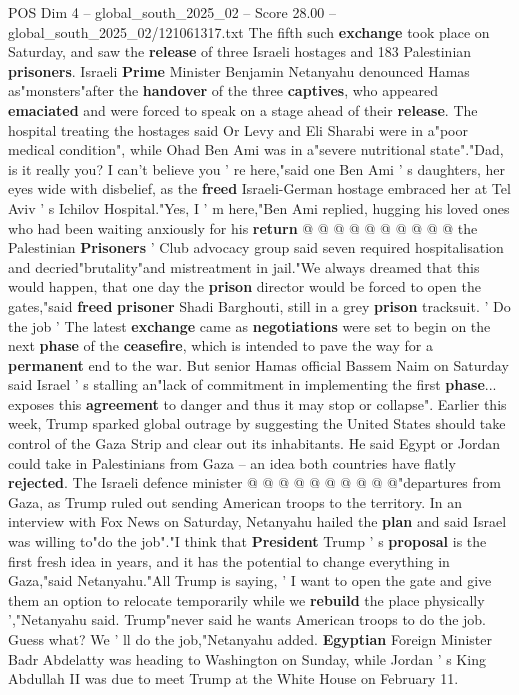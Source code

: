 \begin{textsample}{POS Dim 4 – global\_south\_2025\_02 – Score 28.00 – global\_south\_2025\_02/121061317.txt}
The fifth such \textbf{exchange} took place on Saturday, and saw the \textbf{release} of three Israeli hostages and 183 Palestinian \textbf{prisoners}.
Israeli \textbf{Prime} Minister Benjamin Netanyahu denounced Hamas as"monsters"after the \textbf{handover} of the three \textbf{captives}, who appeared \textbf{emaciated} and were forced to speak on a stage ahead of their \textbf{release}.
The hospital treating the hostages said Or Levy and Eli Sharabi were in a"poor medical condition", while Ohad Ben Ami was in a"severe nutritional state"."Dad, is it really you?
I can't believe you ' re here,"said one Ben Ami ' s daughters, her eyes wide with disbelief, as the \textbf{freed} Israeli-German hostage embraced her at Tel Aviv ' s Ichilov Hospital."Yes, I ' m here,"Ben Ami replied, hugging his loved ones who had been waiting anxiously for his \textbf{return} @ @ @ @ @ @ @ @ @ @ the Palestinian \textbf{Prisoners} ' Club advocacy group said seven required hospitalisation and decried"brutality"and mistreatment in jail."We always dreamed that this would happen, that one day the \textbf{prison} director would be forced to open the gates,"said \textbf{freed} \textbf{prisoner} Shadi Barghouti, still in a grey \textbf{prison} tracksuit. ' Do the job ' The latest \textbf{exchange} came as \textbf{negotiations} were set to begin on the next \textbf{phase} of the \textbf{ceasefire}, which is intended to pave the way for a \textbf{permanent} end to the war.
But senior Hamas official Bassem Naim on Saturday said Israel ' s stalling an"lack of commitment in implementing the first \textbf{phase}... exposes this \textbf{agreement} to danger and thus it may stop or collapse".
Earlier this week, Trump sparked global outrage by suggesting the United States should take control of the Gaza Strip and clear out its inhabitants.
He said Egypt or Jordan could take in Palestinians from Gaza -- an idea both countries have flatly \textbf{rejected}.
The Israeli defence minister @ @ @ @ @ @ @ @ @ @"departures from Gaza, as Trump ruled out sending American troops to the territory.
In an interview with Fox News on Saturday, Netanyahu hailed the \textbf{plan} and said Israel was willing to"do the job"."I think that \textbf{President} Trump ' s \textbf{proposal} is the first fresh idea in years, and it has the potential to change everything in Gaza,"said Netanyahu."All Trump is saying, ' I want to open the gate and give them an option to relocate temporarily while we \textbf{rebuild} the place physically ',"Netanyahu said.
Trump"never said he wants American troops to do the job.
Guess what?
We ' ll do the job,"Netanyahu added. \textbf{Egyptian} Foreign Minister Badr Abdelatty was heading to Washington on Sunday, while Jordan ' s King Abdullah II was due to meet Trump at the White House on February 11.

\end{textsample}
